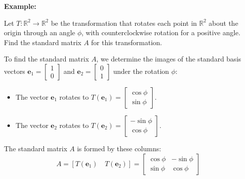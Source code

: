 \documentclass[../linear-algebra.tex]{subfiles}
\begin{document}
\noindent \textbf{Example:}

\noindent Let $T : \mathbb{R}^2 \to \mathbb{R}^2$ be the transformation that rotates each point in $\mathbb{R}^2$ about the origin through an angle $\phi$, with counterclockwise rotation for a positive angle. Find the standard matrix $A$ for this transformation.

\vspace{1em}
\noindent To find the standard matrix $A$, we determine the images of the standard basis vectors $\mathbf{e}_1 = \begin{bmatrix} 1 \\ 0 \end{bmatrix}$ and $\mathbf{e}_2 = \begin{bmatrix} 0 \\ 1 \end{bmatrix}$ under the rotation $\phi$:

\begin{itemize}
    \item The vector $\mathbf{e}_1$ rotates to $T(\mathbf{e}_1) = \begin{bmatrix} \cos \phi \\ \sin \phi \end{bmatrix}$.
    \item The vector $\mathbf{e}_2$ rotates to $T(\mathbf{e}_2) = \begin{bmatrix} -\sin \phi \\ \cos \phi \end{bmatrix}$.
\end{itemize}

The standard matrix $A$ is formed by these columns:
\[
A = [T(\mathbf{e}_1) \quad T(\mathbf{e}_2)] = \begin{bmatrix} \cos \phi & -\sin \phi \\ \sin \phi & \cos \phi \end{bmatrix}
\]
\end{document}
